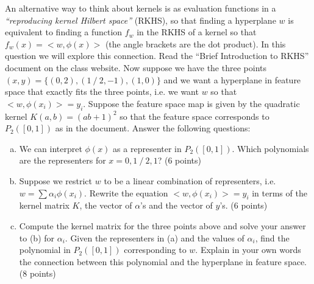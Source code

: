 \documentclass[fleqn]{homework}
\begin{document}
  \begin{problem}{4}
    \begin{question}
      An alternative way to think about kernels is as evaluation functions in a
      \textit{“reproducing kernel Hilbert space”} (RKHS), so that finding a
      hyperplane $w$ is equivalent to finding a function $f_w$ in the RKHS of a
      kernel so that $f_w(x)=<w, \phi(x)>$ (the angle brackets are the dot
      product). In this question we will explore this connection. Read the
      ``Brief Introduction to RKHS'' document on the class website. Now suppose
      we have the three points $(x,y)=\{(0,2), (1⁄2,−1), (1,0)\}$ and we want a
      hyperplane in feature space that exactly fits the three points, i.e. we
      want $w$ so that $<w, \phi(x_i)>=y_i$. Suppose the feature space map is
      given by the quadratic kernel $K(a,b)=(ab+1)^2$ so that the feature space
      corresponds to $P_2([0,1])$ as in the document. Answer the following
      questions:

      \begin{enumerate}[(a)]
      \item We can interpret $\phi(x)$ as a representer in $P_2([0,1])$. Which
        polynomials are the representers for $x=0, 1⁄2, 1$? (6 points)
      \item Suppose we restrict $w$ to be a linear combination of representers,
        i.e. $w=\sum α_i \phi(x_i)$. Rewrite the equation $<w, \phi(x_i)>=y_i$
        in terms of the kernel matrix $K$, the vector of $\alpha$’s and the
        vector of $y$’s. (6 points)
      \item Compute the kernel matrix for the three points above and solve your
        answer to (b) for $\alpha_i$.  Given the representers in (a) and the
        values of $\alpha_i$, find the polynomial in $P_2([0,1])$ corresponding
        to $w$. Explain in your own words the connection between this polynomial
        and the hyperplane in feature space. (8 points)
      \end{enumerate}
    \end{question}
  \end{problem}
\end{document}
